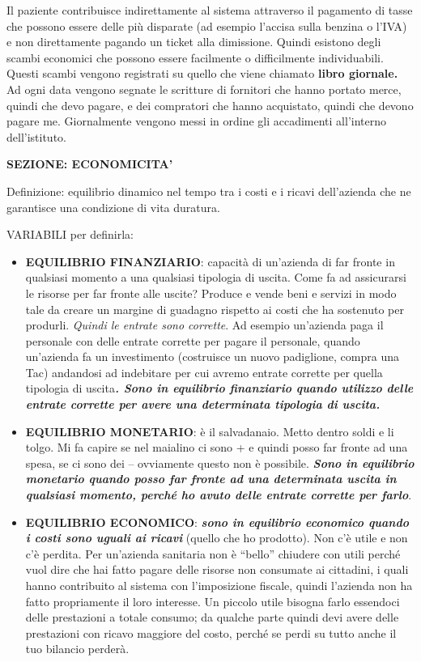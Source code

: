 \documentclass[]{article}
\begin{document}
Il paziente contribuisce indirettamente al sistema attraverso il
pagamento di tasse che possono essere delle più disparate (ad esempio
l'accisa sulla benzina o l'IVA) e non direttamente pagando un ticket
alla dimissione. Quindi esistono degli scambi economici che possono
essere facilmente o difficilmente individuabili. Questi scambi vengono
registrati su quello che viene chiamato \textbf{libro giornale.} Ad ogni
data vengono segnate le scritture di fornitori che hanno portato merce,
quindi che devo pagare, e dei compratori che hanno acquistato, quindi
che devono pagare me. Giornalmente vengono messi in ordine gli
accadimenti all'interno dell'istituto.

\textbf{SEZIONE: ECONOMICITA'}

Definizione: equilibrio dinamico nel tempo tra i costi e i ricavi
dell'azienda che ne garantisce una condizione di vita duratura.

VARIABILI per definirla:

\begin{itemize}
\item
  \textbf{EQUILIBRIO FINANZIARIO}: capacità di un'azienda di far fronte
  in qualsiasi momento a una qualsiasi tipologia di uscita. Come fa ad
  assicurarsi le risorse per far fronte alle uscite? Produce e vende
  beni e servizi in modo tale da creare un margine di guadagno rispetto
  ai costi che ha sostenuto per produrli. \emph{Quindi le entrate sono
  corrette}. Ad esempio un'azienda paga il personale con delle entrate
  corrette per pagare il personale, quando un'azienda fa un investimento
  (costruisce un nuovo padiglione, compra una Tac) andandosi ad
  indebitare per cui avremo entrate corrette per quella tipologia di
  uscita\textbf{\emph{. Sono in equilibrio finanziario quando utilizzo
  delle entrate corrette per avere una determinata tipologia di
  uscita.}}
\item
  \textbf{EQUILIBRIO MONETARIO}: è il salvadanaio. Metto dentro soldi e
  li tolgo. Mi fa capire se nel maialino ci sono + e quindi posso far
  fronte ad una spesa, se ci sono dei -- ovviamente questo non è
  possibile. \textbf{\emph{Sono in equilibrio monetario quando posso far
  fronte ad una determinata uscita in qualsiasi momento, perché ho avuto
  delle entrate corrette per farlo}}.
\item
  \textbf{EQUILIBRIO ECONOMICO}: \textbf{\emph{sono in equilibrio
  economico quando i costi sono uguali ai ricavi}} (quello che ho
  prodotto). Non c'è utile e non c'è perdita. Per un'azienda sanitaria
  non è ``bello'' chiudere con utili perché vuol dire che hai fatto
  pagare delle risorse non consumate ai cittadini, i quali hanno
  contribuito al sistema con l'imposizione fiscale, quindi l'azienda non
  ha fatto propriamente il loro interesse. Un piccolo utile bisogna
  farlo essendoci delle prestazioni a totale consumo; da qualche parte
  quindi devi avere delle prestazioni con ricavo maggiore del costo,
  perché se perdi su tutto anche il tuo bilancio perderà.
\end{itemize}
\end{document}
